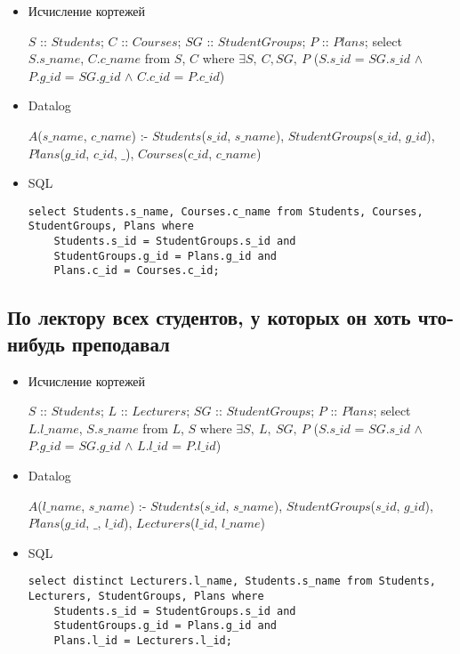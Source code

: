 \documentclass[12pt,a4paper,oneside]{article}
\begin{document}
\begin{itemize}

\item Исчисление кортежей

$S$ :: $Students$; $C$ :: $Courses$; $SG$ :: $StudentGroups$; $P$ :: $Plans$; select $S.s\_name$, $C.c\_name$ from $S$, $C$ where $\exists S,\ C, SG,\ P$ ($S.s\_id$ = $SG.s\_id$ $\wedge$ $P.g\_id$ = $SG.g\_id$ $\wedge$ $C.c\_id$ = $P.c\_id$)

\item Datalog

$A$($s\_name$, $c\_name$) :- $Students$($s\_id$, $s\_name$), $StudentGroups$($s\_id$, $g\_id$), $Plans$($g\_id$, $c\_id$, $\_$), $Courses$($c\_id$, $c\_name$)

\item SQL

\begin{lstlisting}[label=task6,caption={Задание 6}]
select Students.s_name, Courses.c_name from Students, Courses, StudentGroups, Plans where
    Students.s_id = StudentGroups.s_id and
    StudentGroups.g_id = Plans.g_id and
    Plans.c_id = Courses.c_id;
\end{lstlisting}

\end{itemize}

\subsection{По лектору всех студентов, у которых он хоть что-нибудь преподавал}

\begin{itemize}

\item Исчисление кортежей

$S$ :: $Students$; $L$ :: $Lecturers$; $SG$ :: $StudentGroups$; $P$ :: $Plans$; select $L.l\_name$, $S.s\_name$ from $L$, $S$ where $\exists S,\ L,\ SG,\ P$ ($S.s\_id$ = $SG.s\_id$ $\wedge$ $P.g\_id$ = $SG.g\_id$ $\wedge$ $L.l\_id$ = $P.l\_id$)

\item Datalog

$A$($l\_name$, $s\_name$) :- $Students$($s\_id$, $s\_name$), $StudentGroups$($s\_id$, $g\_id$), $Plans$($g\_id$, $\_$, $l\_id$), $Lecturers$($l\_id$, $l\_name$)

\item SQL

\begin{lstlisting}[label=task7,caption={Задание 7}]
select distinct Lecturers.l_name, Students.s_name from Students, Lecturers, StudentGroups, Plans where
    Students.s_id = StudentGroups.s_id and
    StudentGroups.g_id = Plans.g_id and
    Plans.l_id = Lecturers.l_id;
\end{lstlisting}

\end{itemize}
\end{document}
